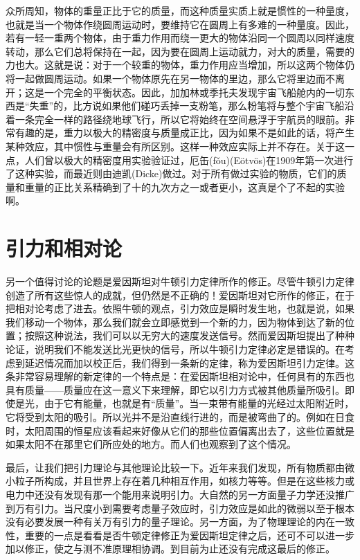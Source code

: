 \documentclass[12pt,oneside]{book}
\begin{document}
\begin{common-format}
众所周知，物体的重量正比于它的质量，而这种质量实质上就是惯性的一种量度，也就是当一个物体作绕圆周运动时，要维持它在圆周上有多难的一种量度。因此，若有一轻一重两个物体，由于重力作用而绕一更大的物体沿同一个圆周以同样速度转动，那么它们总将保持在一起，因为要在圆周上运动就力，对大的质量，需要的力也大。这就是说：对于一个较重的物体，重力作用应当增加，所以这两个物体仍将一起做圆周运动。如果一个物体原先在另一物体的里边，那么它将里边而不离开；这是一个完全的平衡状态。因此，加加林或季托夫发现宇宙飞船舱内的一切东西是“失重”的，比方说如果他们碰巧丢掉一支粉笔，那么粉笔将与整个宇宙飞船沿着一条完全一样的路径绕地球飞行，所以它将始终在空间悬浮于宇航员的眼前。非常有趣的是，重力以极大的精密度与质量成正比，因为如果不是如此的话，将产生某种效应，其中惯性与重量会有所区别。这样一种效应实际上并不存在。关于这一点，人们曾以极大的精密度用实验验证过，厄缶(fǒu)(E\"otv\"os)在1909年第一次进行了这种实验，而最近则由迪凯(Dicke)做过。对于所有做过实验的物质，它们的质量和重量的正比关系精确到了十的九次方之一或者更小，这真是个了不起的实验啊。



\section{引力和相对论}
另一个值得讨论的论题是爱因斯坦对牛顿引力定律所作的修正。尽管牛顿引力定律创造了所有这些惊人的成就，但仍然是不正确的！爱因斯坦对它所作的修正，在于把相对论考虑了进去。依照牛顿的观点，引力效应是瞬时发生地，也就是说，如果我们移动一个物体，那么我们就会立即感觉到一个新的力，因为物体到达了新的位置；按照这种说法，我们可以以无穷大的速度发送信号。然而爱因斯坦提出了种种论证，说明我们不能发送比光更快的信号，所以牛顿引力定律必定是错误的。在考虑到延迟情况而加以校正后，我们得到一条新的定律，称为爱因斯坦引力定律。这条非常容易理解的新定律的一个特点是：在爱因斯坦相对论中，任何具有的东西也具有质量——质量应在这一意义下来理解，即它以引力方式被其他质量所吸引。即使是光，由于它有能量，也就是有“质量”。当一束带有能量的光经过太阳附近时，它将受到太阳的吸引。所以光并不是沿直线行进的，而是被弯曲了的。例如在日食时，太阳周围的恒星应该看起来好像从它们的那些位置偏离出去了，这些位置就是如果太阳不在那里它们所应处的地方。而人们也观察到了这个情况。

最后，让我们把引力理论与其他理论比较一下。近年来我们发现，所有物质都由微小粒子所构成，并且世界上存在着几种相互作用，如核力等等。但是在这些核力或电力中还没有发现有那一个能用来说明引力。大自然的另一方面量子力学还没推广到万有引力。当尺度小到需要考虑量子效应时，引力效应是如此的微弱以至于根本没有必要发展一种有关万有引力的量子理论。另一方面，为了物理理论的内在一致性，重要的一点是看看是否牛顿定律修正为爱因斯坦定律之后，还可不可以进一步加以修正，使之与测不准原理相协调。到目前为止还没有完成这最后的修正。


\end{common-format}
\end{document}
